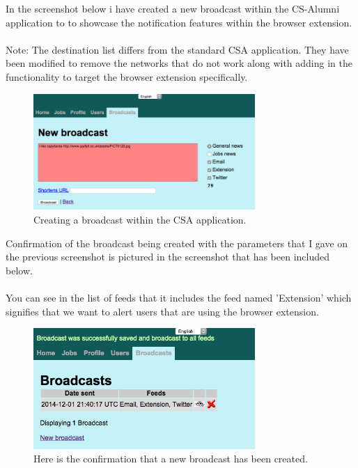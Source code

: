 \documentclass{article}
\begin{document}
In the screenshot below i have created a new broadcast within the CS-Alumni application to to showcase the notification features within the browser extension.\\
\\
Note: The destination list differs from the standard CSA application. They have been modified to remove the networks that do not work along with adding in the functionality to target the browser extension specifically.\\

\begin{figure}[H]
\centering
\includegraphics[width=0.75\textwidth]{createbc}
\caption{Creating a broadcast within the CSA application.}
\end{figure}

\newpage
Confirmation of the broadcast being created with the parameters that I gave on the previous screenshot is pictured in the screenshot that has been included below.\\
\\
You can see in the list of feeds that it includes the feed named 'Extension' which signifies that we want to alert users that are using the browser extension.

\begin{figure}[H]
\centering
\includegraphics[width=0.75\textwidth]{confbc}
\caption{Here is the confirmation that a new broadcast has been created.}
\end{figure}
\end{document}
